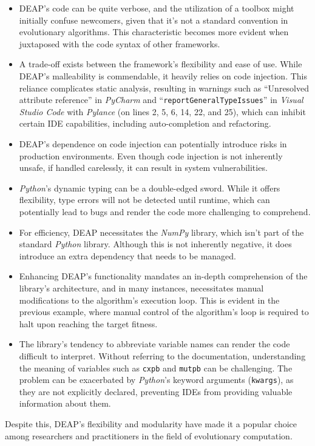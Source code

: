   \begin{itemize}
    \item DEAP's code can be quite verbose, and the utilization of a toolbox
      might initially confuse newcomers, given that it's not a standard
      convention in evolutionary algorithms.
      This characteristic becomes more evident when juxtaposed with the code
      syntax of other frameworks.
    \item A trade-off exists between the framework's flexibility and ease of
      use.
      While DEAP's malleability is commendable, it heavily relies on code
      injection.
      This reliance complicates static analysis, resulting in warnings such as
      \enquote{Unresolved attribute reference} in \textit{PyCharm} and 
      \enquote{\texttt{reportGeneralTypeIssues}} in \textit{Visual Studio
      Code} with \textit{Pylance} (on lines 2, 5, 6, 14, 22, and 25), which
      can inhibit certain IDE capabilities, including auto-completion and
      refactoring.
    \item DEAP's dependence on code injection can potentially introduce risks
      in production environments.
      Even though code injection is not inherently unsafe, if handled
      carelessly, it can result in system vulnerabilities.
    \item \textit{Python}'s dynamic typing can be a double-edged sword.
      While it offers flexibility, type errors will not be detected until
      runtime, which can potentially lead to bugs and render the code more
      challenging to comprehend.
    \item For efficiency, DEAP necessitates the \textit{NumPy} library, which
      isn't part of the standard \textit{Python} library.
      Although this is not inherently negative, it does introduce an extra
      dependency that needs to be managed.
    \item Enhancing DEAP's functionality mandates an in-depth comprehension of
      the library's architecture, and in many instances, necessitates manual
      modifications to the algorithm's execution loop.
      This is evident in the previous example, where manual control of the
      algorithm's loop is required to halt upon reaching the target fitness.
    \item The library's tendency to abbreviate variable names can render the
      code difficult to interpret.
      Without referring to the documentation, understanding the meaning of
      variables such as \texttt{cxpb} and \texttt{mutpb} can be challenging.
      The problem can be exacerbated by \textit{Python}'s keyword arguments
      (\texttt{kwargs}), as they are not explicitly declared, preventing IDEs
      from providing valuable information about them.
  \end{itemize}

  Despite this, DEAP's flexibility and modularity have made it a popular choice
  among researchers and practitioners in the field of evolutionary computation.
